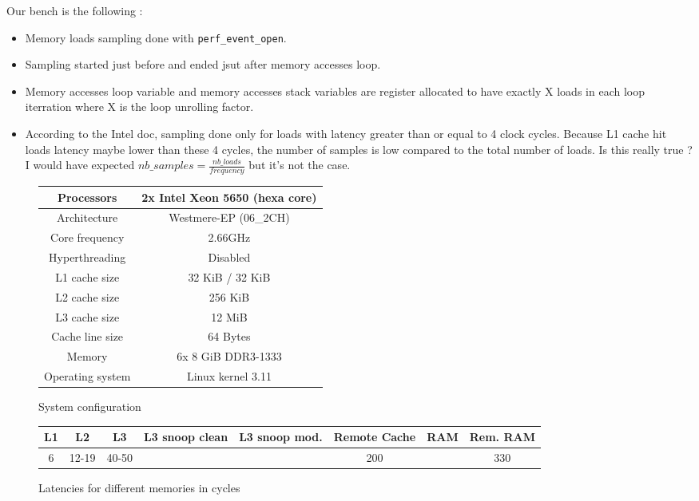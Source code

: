 \documentclass[10pt,a4paper]{article}
\begin{document}
Our bench is the following :
\begin{itemize}
\item Memory loads sampling done with \texttt{perf\_event\_open}.
\item  Sampling  started  just  before and  ended  jsut  after  memory
  accesses loop.
\item  Memory  accesses  loop   variable  and  memory  accesses  stack
  variables are  register allocated  to have exactly  X loads  in each
  loop iterration where X is the loop unrolling factor.
\item According  to the Intel doc,  sampling done only for  loads with
  latency greater  than or equal to  4 clock cycles. Because  L1 cache
  hit loads  latency maybe lower  than these  4 cycles, the  number of
  samples is low compared to the total number of loads. Is this really
  true    ?      I    would     have    expected     $nb\_samples    =
  \frac{nb\_loads}{frequency}$ but it's not the case.
\end{itemize}

\begin{figure}[h]
  \centering
  \begin{tabular}[h]{|c|c|}
    \hline
    Processors       & 2x Intel Xeon 5650 (hexa core) \\
    \hline
    Architecture     & Westmere-EP (06\_2CH)          \\
    \hline
    Core frequency   & 2.66GHz                        \\
    \hline
    Hyperthreading   & Disabled                       \\
    \hline
    L1 cache size    & 32 KiB / 32 KiB                \\
     \hline
    L2 cache size    & 256 KiB                        \\
    \hline
    L3 cache size    & 12 MiB                         \\
    \hline
    Cache line size  & 64 Bytes                       \\
    \hline
    Memory           & 6x 8 GiB DDR3-1333             \\
    \hline
    Operating system & Linux kernel 3.11              \\
    \hline
  \end{tabular}
  \caption{System configuration}
  \label{tab:config}
\end{figure}

\begin{figure}[h]
  \begin{tabular}{|c|c|c|c|c|c|c|c|}
    \hline
    L1 & L2    & L3    & L3 snoop clean & L3 snoop mod. & Remote Cache & RAM & Rem. RAM \\
    \hline
    6  & 12-19 & 40-50 &                &               & 200          &     & 330      \\
    \hline
  \end{tabular}
  \caption{Latencies for different memories in cycles}
\end{figure}
\end{document}
